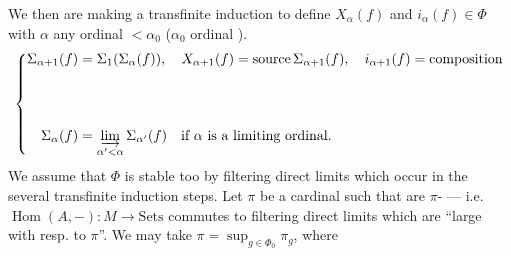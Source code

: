 We then are making a transfinite induction to define $X_\alpha(f)$ and
$i_\alpha(f)\in\Phi$
with $\alpha$ any ordinal \deleted{$\unsure{\Phi}$} $<\alpha_0$ ($\alpha_0$  ordinal    ).
\[
\left\{\begin{aligned}
\Sigma_{\alpha+1}(f)&=\Sigma_1(\Sigma_\alpha(f)),\quad X_{\alpha+1}(f)=\text{source}\,\Sigma_{\alpha+1}(f),\quad i_{\alpha+1}(f)=\text{composition}\\[4em]
\Sigma_\alpha(f)&=\varinjlim_{\alpha'<\alpha}\Sigma_{\alpha'}(f)\quad\text{if $\alpha$ is a limiting ordinal.}
\end{aligned}\right.
\]
 We assume that $\Phi$ is stable too by  filtering direct limits  which occur in the several transfinite induction steps.
Let $\pi$ be a cardinal such that   are $\pi$-
--- i.e. $\operatorname{Hom}(A,-):M\to\mathrm{Sets}$ commutes to filtering direct limits which are  ``large with resp. to $\pi$''. We may take $\pi=\sup_{g\in\Phi_0}\pi_g$, where

